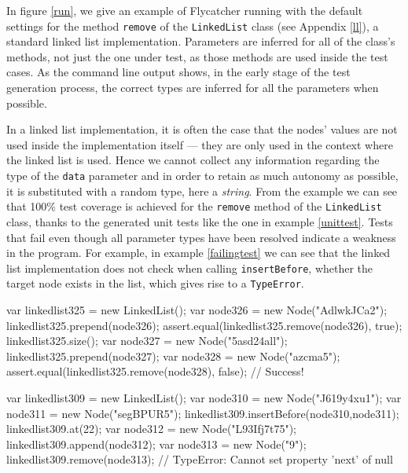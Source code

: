In figure \ref{run}, we give an example of \textsf{Flycatcher} running with the default settings for the method \texttt{remove} of the \texttt{LinkedList} class (see Appendix \ref{ll}), a standard linked list implementation. Parameters are inferred for all of the class's methods, not just the one under test, as those methods are used inside the test cases. As the command line output shows, in the early stage of the test generation process, the correct types are inferred for all the parameters when possible.

In a linked list implementation, it is often the case that the nodes' values are not used inside the implementation itself --- they are only used in the context where the linked list is used. Hence we cannot collect any information regarding the type of the \texttt{data} parameter and in order to retain as much autonomy as possible, it is substituted with a random type, here a \emph{string}. From the example we can see that 100\% test coverage is achieved for the \texttt{remove} method of the \texttt{LinkedList} class, thanks to the generated unit tests like the one in example \ref{unittest}. Tests that fail even though all parameter types have been resolved indicate a weakness in the program. For example, in example \ref{failingtest} we can see that the linked list implementation does not check when calling \texttt{insertBefore}, whether the target node exists in the list, which gives rise to a \texttt{TypeError}.\\[4cm]

\begin{code}[caption=Unit test, label=unittest]
var linkedlist325 = new LinkedList();
var node326 = new Node("AdlwkJCa2");
linkedlist325.prepend(node326);
assert.equal(linkedlist325.remove(node326), true);
linkedlist325.size();
var node327 = new Node("5asd24all");
linkedlist325.prepend(node327);
var node328 = new Node("azcma5");
assert.equal(linkedlist325.remove(node328), false);
// Success!
\end{code}

\begin{code}[caption=Failing test, label=failingtest]
var linkedlist309 = new LinkedList();
var node310 = new Node("J619y4xu1");
var node311 = new Node("segBPUR5");
linkedlist309.insertBefore(node310,node311);
linkedlist309.at(22);
var node312 = new Node("L93Ifj7t75");
linkedlist309.append(node312);
var node313 = new Node("9");
linkedlist309.remove(node313);
// TypeError: Cannot set property 'next' of null   
\end{code}


